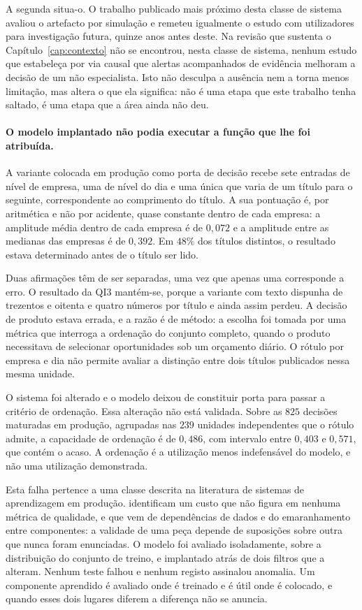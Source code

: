 A segunda situa-o. O trabalho publicado mais próximo desta classe de sistema
\autocite{muntermann2009ubiquitous} avaliou o artefacto por simulação e remeteu igualmente o
estudo com utilizadores para investigação futura, quinze anos antes deste. Na revisão que sustenta
o Capítulo~\ref{cap:contexto} não se encontrou, nesta classe de sistema, nenhum estudo que
estabeleça por via causal que alertas acompanhados de evidência melhoram a decisão de um não
especialista. Isto não desculpa a ausência nem a torna menos limitação, mas altera o que ela
significa: não é uma etapa que este trabalho tenha saltado, é uma etapa que a área ainda não deu.

\paragraph{O modelo implantado não podia executar a função que lhe foi atribuída.}
A variante colocada em produção como porta de decisão recebe sete entradas de nível de empresa, uma
de nível do dia e uma única que varia de um título para o seguinte, correspondente ao comprimento do
título. A sua pontuação é, por aritmética e não por acidente, quase constante dentro de cada
empresa: a amplitude média dentro de cada empresa é de $0{,}072$ e a amplitude entre as medianas das
empresas é de $0{,}392$. Em $48\%$ dos títulos distintos, o resultado estava determinado antes de o
título ser lido.

Duas afirmações têm de ser separadas, uma vez que apenas uma corresponde a erro. O resultado da
\gls{QI}3 mantém-se, porque a variante com texto dispunha de trezentos e oitenta e quatro números
por título e ainda assim perdeu. A decisão de produto estava errada, e a razão é de método: a
escolha foi tomada por uma métrica que interroga a ordenação do conjunto completo, quando o produto
necessitava de selecionar oportunidades sob um orçamento diário. O rótulo por empresa e dia
não permite avaliar a distinção entre dois títulos publicados nessa mesma unidade.

O sistema foi alterado e o modelo deixou de constituir porta para passar a critério de ordenação.
Essa alteração não está validada. Sobre as $825$ decisões maturadas em produção, agrupadas nas $239$
unidades independentes que o rótulo admite, a capacidade de ordenação é de $0{,}486$, com intervalo
entre $0{,}403$ e $0{,}571$, que contém o acaso. A ordenação é a utilização menos indefensável do
modelo, e não uma utilização demonstrada.

Esta falha pertence a uma classe descrita na literatura de sistemas de aprendizagem em produção.
\textcite{sculley2015debt} identificam um custo que não figura em nenhuma métrica de qualidade, e
que vem de dependências de dados e do emaranhamento entre componentes: a validade de uma peça
depende de suposições sobre outra que nunca foram enunciadas. O modelo foi avaliado isoladamente,
sobre a distribuição do conjunto de treino, e implantado atrás de dois filtros que a alteram. Nenhum
teste falhou e nenhum registo assinalou anomalia. Um componente aprendido é avaliado onde é treinado
e é útil onde é colocado, e quando esses dois lugares diferem a diferença não se anuncia.

